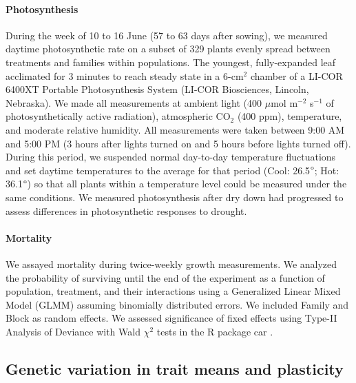 \documentclass[11pt, oneside]{article}
\newcommand{\pkg}[1]{{\fontseries{b}\selectfont #1}}
\begin{document}
\paragraph{Photosynthesis}
During the week of 10 to 16 June (57 to 63 days after sowing), we measured daytime photosynthetic rate on a subset of 329 plants evenly spread between treatments and families within populations. The youngest, fully-expanded leaf acclimated for 3 minutes to reach steady state in a 6-cm$^2$ chamber of a LI-COR 6400XT Portable Photosynthesis System (LI-COR Biosciences, Lincoln, Nebraska). We made all measurements at ambient light (400 $\mu$mol m$^{-2}$ s$^{-1}$ of photosynthetically active radiation), atmospheric CO$_2$ (400 ppm), temperature, and moderate relative humidity. All measurements were taken between 9:00 AM and 5:00 PM (3 hours after lights turned on and 5 hours before lights turned off). During this period, we suspended normal day-to-day temperature fluctuations and set daytime temperatures to the average for that period (Cool: 26.5$\degree$; Hot: 36.1$\degree$) so that all plants within a temperature level could be measured under the same conditions. We measured photosynthesis after dry down had progressed to assess differences in photosynthetic responses to drought.


\paragraph{Mortality}
We assayed mortality during twice-weekly growth measurements. We analyzed the probability of surviving until the end of the experiment as a function of population, treatment, and their interactions using a Generalized Linear Mixed Model (GLMM) assuming binomially distributed errors. We included Family and Block as random effects. We assessed significance of fixed effects using Type-II Analysis of Deviance with Wald $\chi ^2$ tests in the R package \pkg{car} \citep{Fox_Weisberg_2011}. 


\subsection*{Genetic variation in trait means and plasticity}
\end{document}
